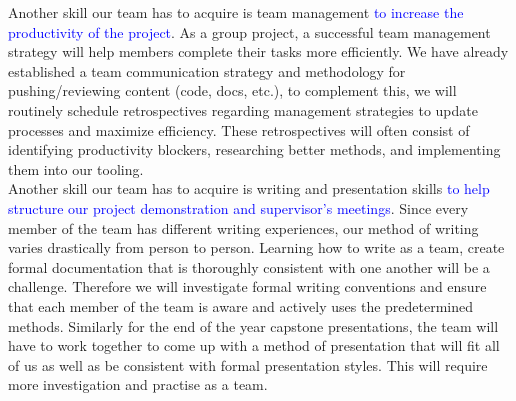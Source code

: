 \documentclass[12pt, titlepage]{article}
\begin{document}
\noindent Another skill our team has to acquire is team management \textcolor{blue}{to increase the productivity of the project}. As a group project, a successful team management strategy will help members complete their tasks more efficiently. We have already established a team communication strategy and methodology for pushing/reviewing content (code, docs, etc.), to complement this, we will routinely schedule retrospectives regarding management strategies to update processes and maximize efficiency. These retrospectives will often consist of identifying productivity blockers, researching better methods, and implementing them into our tooling. \\

\noindent Another skill our team has to acquire is writing and presentation skills \textcolor{blue}{to help structure our project demonstration and supervisor's meetings}. Since every member of the team has different writing experiences, our method of writing varies drastically from person to person. Learning how to write as a team, create formal documentation that is thoroughly consistent with one another will be a challenge. Therefore we will investigate formal writing conventions and ensure that each member of the team is aware and actively uses the predetermined methods. Similarly for the end of the year capstone presentations, the team will have to work together to come up with a method of presentation that will fit all of us as well as be consistent with formal presentation styles. This will require more investigation and practise as a team.\\



\end{document}
